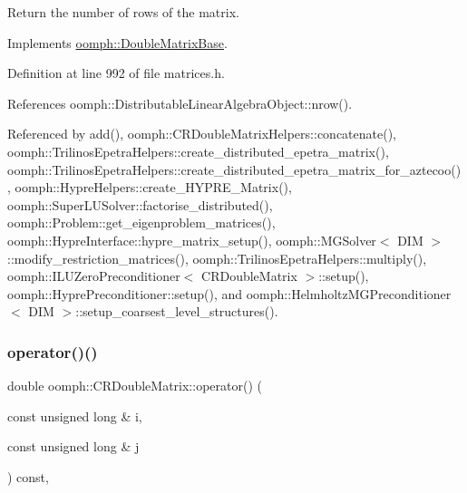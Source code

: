 Return the number of rows of the matrix. 



Implements \hyperlink{classoomph_1_1DoubleMatrixBase_acdcd6e1ea2bf2380f1a2fa32c7829cb5}{oomph\+::\+Double\+Matrix\+Base}.



Definition at line 992 of file matrices.\+h.



References oomph\+::\+Distributable\+Linear\+Algebra\+Object\+::nrow().



Referenced by add(), oomph\+::\+C\+R\+Double\+Matrix\+Helpers\+::concatenate(), oomph\+::\+Trilinos\+Epetra\+Helpers\+::create\+\_\+distributed\+\_\+epetra\+\_\+matrix(), oomph\+::\+Trilinos\+Epetra\+Helpers\+::create\+\_\+distributed\+\_\+epetra\+\_\+matrix\+\_\+for\+\_\+aztecoo(), oomph\+::\+Hypre\+Helpers\+::create\+\_\+\+H\+Y\+P\+R\+E\+\_\+\+Matrix(), oomph\+::\+Super\+L\+U\+Solver\+::factorise\+\_\+distributed(), oomph\+::\+Problem\+::get\+\_\+eigenproblem\+\_\+matrices(), oomph\+::\+Hypre\+Interface\+::hypre\+\_\+matrix\+\_\+setup(), oomph\+::\+M\+G\+Solver$<$ D\+I\+M $>$\+::modify\+\_\+restriction\+\_\+matrices(), oomph\+::\+Trilinos\+Epetra\+Helpers\+::multiply(), oomph\+::\+I\+L\+U\+Zero\+Preconditioner$<$ C\+R\+Double\+Matrix $>$\+::setup(), oomph\+::\+Hypre\+Preconditioner\+::setup(), and oomph\+::\+Helmholtz\+M\+G\+Preconditioner$<$ D\+I\+M $>$\+::setup\+\_\+coarsest\+\_\+level\+\_\+structures().

\mbox{\label{classoomph_1_1CRDoubleMatrix_af5b1d934bae618c92aa1089671b6130e}} 
\subsubsection{\texorpdfstring{operator()()}{operator()()}}
{\footnotesize\ttfamily double oomph\+::\+C\+R\+Double\+Matrix\+::operator() (\begin{DoxyParamCaption}\item[{const unsigned long \&}]{i,  }\item[{const unsigned long \&}]{j }\end{DoxyParamCaption}) const\hspace{0.3cm}{\ttfamily [inline]}, {\ttfamily [virtual]}}

